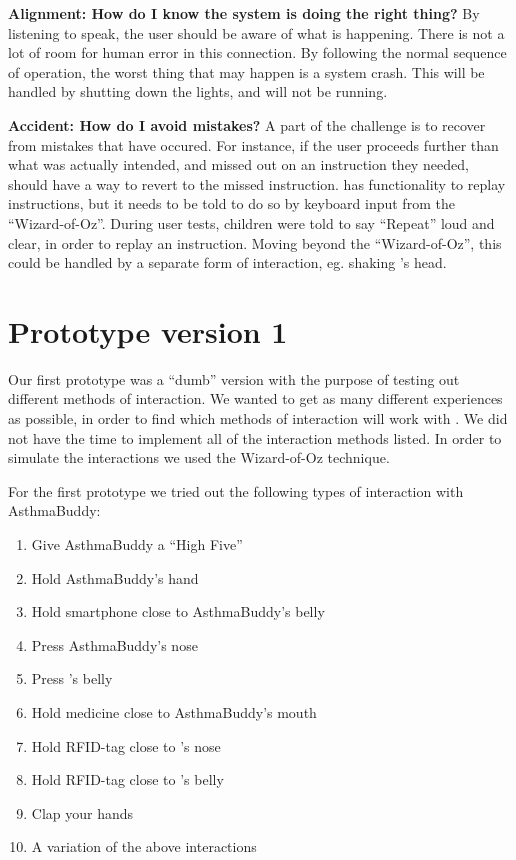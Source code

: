 \textbf{Alignment: How do I know the system is doing the right thing?}
By listening to \buddy{} speak, the user should be aware of what is happening. There is not a lot of room for human error in this connection. By following the normal sequence of operation, the worst thing that may happen is a system crash. This will be handled by shutting down the lights, and \buddy{} will not be running.  

\textbf{Accident: How do I avoid mistakes?}
A part of the challenge is to recover from mistakes that have occured. For instance, if the user proceeds further than what was actually intended, and missed out on an instruction they needed, \buddy{} should have a way to revert to the missed instruction. \ab{} has functionality to replay instructions, but it needs to be told to do so by keyboard input from the ``Wizard-of-Oz''. During user tests, children were told to say ``Repeat'' loud and clear, in order to replay an instruction. Moving beyond the ``Wizard-of-Oz'', this could be handled by a separate form of interaction, eg. shaking \ab{}'s head.       


 

\section{Prototype version 1}
\label{sec:proto1}
Our first prototype was a ``dumb'' version with the purpose of testing out different methods of interaction. We wanted to get as many different experiences as possible, in order to find which methods of interaction will work with \ab{}. We did not have the time to implement all of the interaction methods listed. In order to simulate the interactions we used the Wizard-of-Oz technique\cite{wilson1988rapid}. 

For the first prototype we tried out the following types of interaction with AsthmaBuddy:
\begin{enumerate}
	\item{Give AsthmaBuddy a ``High Five''}
	\item{Hold AsthmaBuddy's hand}
	\item{Hold smartphone close to AsthmaBuddy's belly}
	\item{Press AsthmaBuddy's nose}
	\item{Press \buddy{}'s belly}
	\item{Hold medicine close to AsthmaBuddy's mouth}
	\item{Hold RFID-tag close to \buddy{}'s nose}
	\item{Hold RFID-tag close to \buddy{}'s belly}
	\item{Clap your hands}
	\item{A variation of the above interactions}
\end{enumerate}
	
